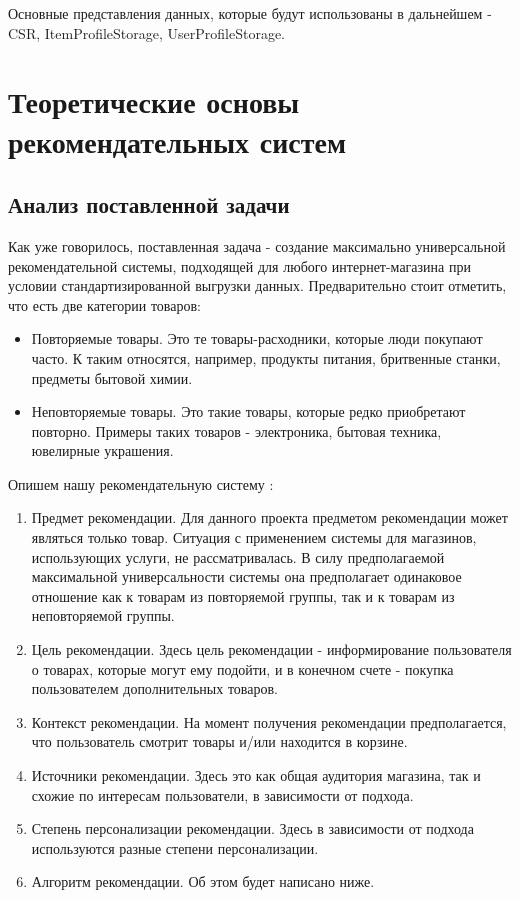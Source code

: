 \documentclass[14pt]{mmcs_article}
\newenvironment{myenumerate}
{ \begin{enumerate}
		\setlength{\itemsep}{0pt}
		\setlength{\parskip}{0pt}
		\setlength{\parsep}{0pt}     }
	{ \end{enumerate}                  }
\begin{document}
Основные представления данных, которые будут использованы в дальнейшем - CSR, ItemProfileStorage, UserProfileStorage.


\section{Теоретические основы рекомендательных систем}\label{dsfs}
\subsection{Анализ поставленной задачи}
Как уже говорилось, поставленная задача - создание максимально универсальной рекомендательной системы, подходящей для любого интернет-магазина при условии стандартизированной выгрузки данных.
Предварительно стоит отметить, что есть две категории товаров:
\begin{itemize}
	\item Повторяемые товары. Это те товары-расходники, которые люди покупают часто. К таким относятся, например, продукты питания, бритвенные станки, предметы бытовой химии.
	\item  Неповторяемые товары. Это такие товары, которые редко приобретают повторно. Примеры таких товаров - электроника, бытовая техника, ювелирные украшения.
\end{itemize}
Опишем нашу рекомендательную систему \cite{stud:kimfalk1}:
\begin{myenumerate}
\item Предмет рекомендации. Для данного проекта предметом рекомендации может являться только товар. Ситуация с применением системы для магазинов, использующих услуги, не рассматривалась. В силу предполагаемой максимальной универсальности системы она предполагает одинаковое отношение как к товарам из повторяемой группы, так и к товарам из неповторяемой группы.
\item Цель рекомендации. Здесь цель рекомендации - информирование пользователя о товарах, которые могут ему подойти, и в конечном счете - покупка пользователем дополнительных товаров.
\item Контекст рекомендации. На момент получения рекомендации предполагается, что пользователь смотрит товары и/или находится в корзине.
\item Источники рекомендации. Здесь это как общая аудитория магазина, так и схожие по интересам пользователи, в зависимости от подхода.
\item Степень персонализации рекомендации. Здесь в зависимости от подхода используются разные степени персонализации.
\item Алгоритм рекомендации. Об этом будет написано ниже. 
\end{myenumerate}
\end{document}
